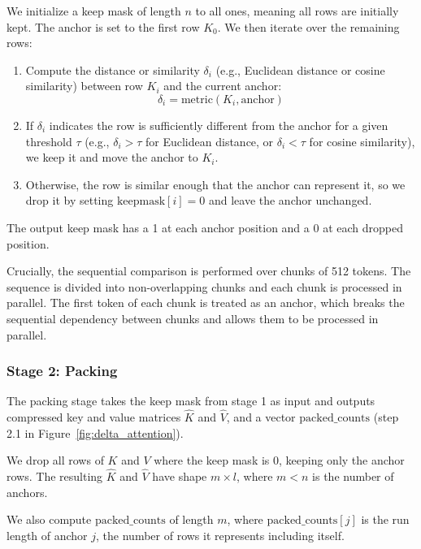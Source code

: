 We initialize a keep mask of length $n$ to all ones, meaning all rows are initially kept. The anchor is set to the first row $K_0$. We then iterate over the remaining rows:

\begin{enumerate}
    \item Compute the distance or similarity $\delta_i$ (e.g., Euclidean distance or cosine similarity) between row $K_i$ and the current anchor:
    \begin{equation}
        \delta_i = \text{metric}(K_i, \text{anchor})
    \end{equation}
    \item If $\delta_i$ indicates the row is sufficiently different from the anchor for a given threshold $\tau$ (e.g., $\delta_i > \tau$ for Euclidean distance, or $\delta_i < \tau$ for cosine similarity), we keep it and move the anchor to $K_i$.
    \item Otherwise, the row is similar enough that the anchor can represent it, so we drop it by setting $\text{keepmask}[i] = 0$ and leave the anchor unchanged.
\end{enumerate}

The output keep mask has a 1 at each anchor position and a 0 at each dropped position.

Crucially, the sequential comparison is performed over chunks of 512 tokens. The sequence is divided into non-overlapping chunks and each chunk is processed in parallel. The first token of each chunk is treated as an anchor, which breaks the sequential dependency between chunks and allows them to be processed in parallel.

\subsubsection{Stage 2: Packing}
\label{sec:packing}

The packing stage takes the keep mask from stage 1 as input and outputs compressed key and value matrices $\hat{K}$ and $\hat{V}$, and a vector $\text{packed\_counts}$ (step 2.1 in Figure~\ref{fig:delta_attention}).

We drop all rows of $K$ and $V$ where the keep mask is 0, keeping only the anchor rows. The resulting $\hat{K}$ and $\hat{V}$ have shape $m \times l$, where $m < n$ is the number of anchors.

We also compute $\text{packed\_counts}$ of length $m$, where $\text{packed\_counts}[j]$ is the run length of anchor $j$, the number of rows it represents including itself.

